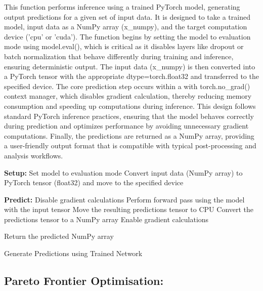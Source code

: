 \documentclass{article}
\begin{document}
This function performs inference using a trained PyTorch model, generating output predictions for a given set of input data. It is designed to take a trained model, input data as a NumPy array (x\_numpy), and the target computation device ('cpu' or 'cuda'). The function begins by setting the model to evaluation mode using model.eval(), which is critical as it disables layers like dropout or batch normalization that behave differently during training and inference, ensuring deterministic output. The input data (x\_numpy) is then converted into a PyTorch tensor with the appropriate dtype=torch.float32 and transferred to the specified device. The core prediction step occurs within a with torch.no\_grad() context manager, which disables gradient calculation, thereby reducing memory consumption and speeding up computations during inference. This design follows standard PyTorch inference practices, ensuring that the model behaves correctly during prediction and optimizes performance by avoiding unnecessary gradient computations. Finally, the predictions are returned as a NumPy array, providing a user-friendly output format that is compatible with typical post-processing and analysis workflows.\\

\begin{algorithm}[H]
\SetAlgoLined %

\textbf{Setup:}\;
Set model to evaluation mode\;
Convert input data (NumPy array) to PyTorch tensor (float32) and move to the specified device\;

\textbf{Predict:}\;
Disable gradient calculations\;
Perform forward pass using the model with the input tensor\;
Move the resulting predictions tensor to CPU\;
Convert the predictions tensor to a NumPy array\;
Enable gradient calculations\; %

Return the predicted NumPy array\;

\caption{Generate Predictions using Trained Network}
\label{alg:predict} %
\end{algorithm}






\subsection{Pareto Frontier Optimisation: }
\end{document}
